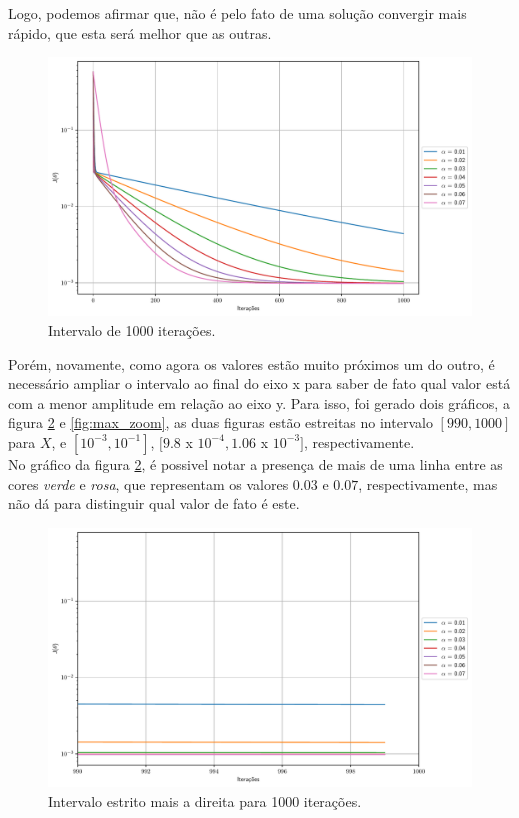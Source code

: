 \documentclass[a4paper, 12pt]{article}
\begin{document}
Logo, podemos afirmar que, não é pelo fato de uma solução convergir mais rápido, que esta será melhor que as outras.
\begin{figure}[!h]
    \centering
    \includegraphics[width=1\textwidth]{../imgs/lr_1000it.pdf}
    \caption{Intervalo de 1000 iterações.}
    \label{fig:lr_100it}
\end{figure}

Porém, novamente, como agora os valores estão muito próximos um do outro, é necessário ampliar o intervalo
ao final do eixo x para saber de fato qual valor está com a menor amplitude em relação ao eixo y. Para isso, foi gerado dois gráficos,
a figura \ref{fig:higher_interval_1000it} e \ref{fig:max_zoom}, as duas figuras estão estreitas no intervalo $[990,1000]$ para $X$, e 
$[10^{-3},10^{-1}]$, $[9.8$ x $10^{-4},1.06$ x $10^{-3}]$, respectivamente.\\

No gráfico da figura \ref{fig:higher_interval_1000it}, é possivel notar a presença de mais de uma linha entre
as cores \textit{verde} e \textit{rosa}, que representam os valores $0.03$ e $0.07$, respectivamente, mas não
dá para distinguir qual valor de fato é este. 

\begin{figure}[!h]
    \centering
    \includegraphics[width=1\textwidth]{../imgs/higher_interval_1000it.pdf}
    \caption{Intervalo estrito mais a direita para 1000 iterações.}
    \label{fig:higher_interval_1000it}
\end{figure}
\end{document}
